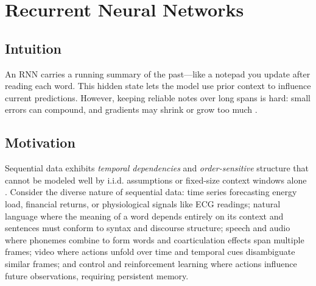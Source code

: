 
\section{Recurrent Neural Networks }
\label{sec:rnns}

\subsection*{Intuition}

An RNN carries a running summary of the past—like a notepad you update after reading each word. This hidden state lets the model use prior context to influence current predictions. However, keeping reliable notes over long spans is hard: small errors can compound, and gradients may shrink or grow too much \cite{GoodfellowEtAl2016}.




\subsection{Motivation}

Sequential data exhibits \emph{temporal dependencies} and \emph{order-sensitive} structure that cannot be modeled well by i.i.d. assumptions or fixed-size context windows alone \cite{GoodfellowEtAl2016,Prince2023,Bishop2006}. Consider the diverse nature of sequential data: time series forecasting energy load, financial returns, or physiological signals like ECG readings; natural language where the meaning of a word depends entirely on its context and sentences must conform to syntax and discourse structure; speech and audio where phonemes combine to form words and coarticulation effects span multiple frames; video where actions unfold over time and temporal cues disambiguate similar frames; and control and reinforcement learning where actions influence future observations, requiring persistent memory.

